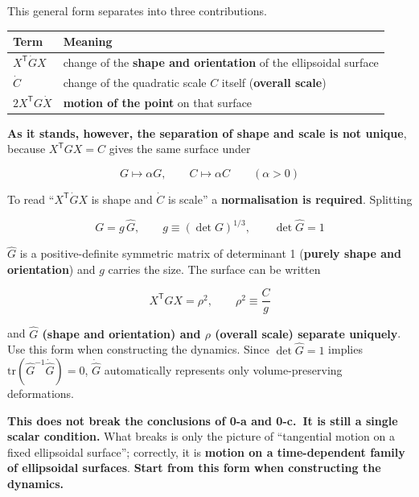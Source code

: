 \documentclass[
  10pt,
]{article}
\newcounter{none} %
\begin{document}
This general form separates into three contributions.

{\def\LTcaptype{none} %
\begin{longtable}[]{@{}
  >{\raggedright\arraybackslash}p{}
  >{\raggedright\arraybackslash}p{}@{}}
\toprule\noalign{}
\begin{minipage}[b]{\linewidth}\raggedright
Term
\end{minipage} & \begin{minipage}[b]{\linewidth}\raggedright
Meaning
\end{minipage} \\
\midrule\noalign{}
\endhead
\bottomrule\noalign{}
\endlastfoot
\(X^{\mathsf T}\dot G X\) & change of the \textbf{shape and orientation}
of the ellipsoidal surface \\
\(\dot C\) & change of the quadratic scale \(C\) itself (\textbf{overall
scale}) \\
\(2X^{\mathsf T}G\dot X\) & \textbf{motion of the point} on that
surface \\
\end{longtable}
}

\textbf{As it stands, however, the separation of shape and scale is not
unique}, because \(X^{\mathsf T}GX = C\) gives the same surface under

\[G \mapsto \alpha G, \qquad C \mapsto \alpha C \qquad (\alpha > 0)\]

To read ``\(X^{\mathsf T}\dot GX\) is shape and \(\dot C\) is scale'' a
\textbf{normalisation is required}. Splitting

\[G = g\,\widehat{G}, \qquad g \equiv (\det G)^{1/3}, \qquad \det\widehat{G} = 1\]

\(\widehat G\) is a positive-definite symmetric matrix of determinant 1
(\textbf{purely shape and orientation}) and \(g\) carries the size. The
surface can be written

\[X^{\mathsf T}\widehat{G}X = \rho^2, \qquad \rho^2 \equiv \frac{C}{g}\]

and \textbf{\(\widehat G\) (shape and orientation) and \(\rho\) (overall
scale) separate uniquely}. Use this form when constructing the dynamics.
Since \(\det\widehat G = 1\) implies
\(\mathrm{tr}(\widehat G^{-1}\dot{\widehat G}) = 0\),
\(\dot{\widehat G}\) automatically represents only volume-preserving
deformations.

\textbf{This does not break the conclusions of 0-a and 0-c.~It is still
a single scalar condition.} What breaks is only the picture of
``tangential motion on a fixed ellipsoidal surface''; correctly, it is
\textbf{motion on a time-dependent family of ellipsoidal surfaces}.
\textbf{Start from this form when constructing the dynamics.}
\end{document}
